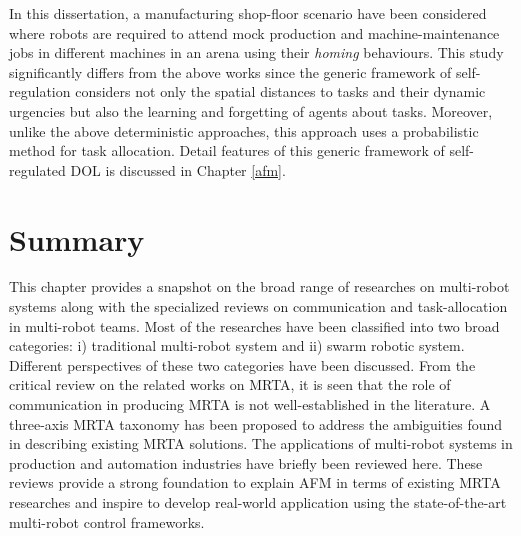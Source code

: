 In this dissertation,  a manufacturing shop-floor scenario have been considered where robots are required to attend mock production and machine-maintenance jobs in different machines in an arena using their {\em homing} behaviours. This study significantly differs from the above works since the generic framework of self-regulation considers not only the spatial distances to tasks and their dynamic urgencies but also the learning and forgetting of agents about tasks. Moreover, unlike the above deterministic approaches, this approach uses a probabilistic method for task allocation. Detail features of this generic framework of self-regulated DOL is discussed in Chapter \ref{afm}.
\section{Summary} 
This chapter provides a snapshot on the broad range of researches on multi-robot systems along with the specialized reviews on communication and task-allocation in multi-robot teams.  Most of the researches have been classified into two broad categories: i) traditional multi-robot system and ii) swarm robotic system. Different perspectives of these two categories have been discussed. From the critical review on the related works on MRTA,  it is seen that the role of communication in producing MRTA is not well-established in the literature. A three-axis MRTA taxonomy has been proposed to address the ambiguities found in describing existing MRTA solutions. The applications of multi-robot systems in production and automation industries have briefly been reviewed here. These reviews provide a strong foundation to explain AFM in terms of existing MRTA researches and inspire to develop real-world application using the state-of-the-art multi-robot control frameworks.